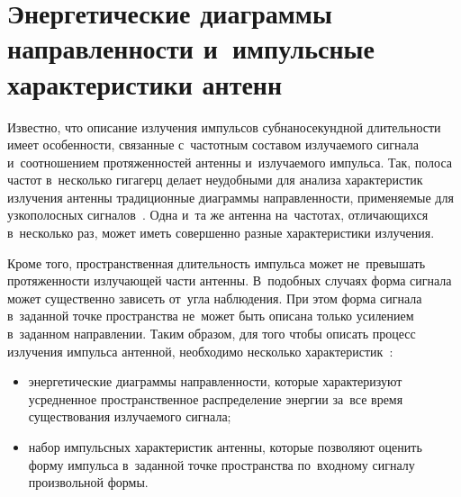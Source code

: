 
\section[Энергетические диаграммы направленности]
        {Энергетические диаграммы направленности и~импульсные характеристики антенн}
\label{div:DirectionalPatternsTheory}

Известно, что описание излучения импульсов субнаносекундной длительности имеет
особенности, связанные с~частотным составом излучаемого сигнала и~соотношением
протяженностей антенны и~излучаемого импульса. Так, полоса частот в~несколько
гигагерц делает неудобными для анализа характеристик излучения антенны
традиционные диаграммы направленности, применяемые для узкополосных
сигналов~\cite{bib:Immoreev2002}. Одна и~та же антенна на~частотах, отличающихся
в~несколько раз, может иметь совершенно разные характеристики излучения.

Кроме того, пространственная длительность импульса может не~превышать
протяженности излучающей части антенны. В~подобных случаях форма сигнала может
существенно зависеть от~угла наблюдения. При этом форма сигнала в~заданной точке
пространства не~может быть описана только усилением в~заданном направлении.
Таким образом, для того чтобы описать процесс излучения импульса антенной,
необходимо несколько характеристик~\cite{bib:Immoreev2002,bib:Astanin1989}:
\begin{itemize}
\item
энергетические диаграммы направленности, которые характеризуют усредненное
пространственное распределение энергии за~все время существования излучаемого
сигнала;
\item
набор импульсных характеристик антенны, которые позволяют оценить форму импульса
в~заданной точке пространства по~входному сигналу произвольной формы.
\end{itemize}

